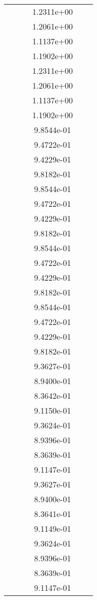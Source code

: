 \begin{xltabular}{\textwidth}{r|rS[table-format=1.3e+2]S[table-format=1.4e+2]S[table-format=1.4e+2]S[table-format=-1.5]}
&  &  & 1.2311e+00 & & \\
&  &  & 1.2061e+00 & & \\
&  &  & 1.1137e+00 & & \\
&  &  & 1.1902e+00 & & \\
&  &  & 1.2311e+00 & & \\
&  &  & 1.2061e+00 & & \\
&  &  & 1.1137e+00 & & \\
&  &  & 1.1902e+00 & & \\
&  &  & 9.8544e-01 & & \\
&  &  & 9.4722e-01 & & \\
&  &  & 9.4229e-01 & & \\
&  &  & 9.8182e-01 & & \\
&  &  & 9.8544e-01 & & \\
&  &  & 9.4722e-01 & & \\
&  &  & 9.4229e-01 & & \\
&  &  & 9.8182e-01 & & \\
&  &  & 9.8544e-01 & & \\
&  &  & 9.4722e-01 & & \\
&  &  & 9.4229e-01 & & \\
&  &  & 9.8182e-01 & & \\
&  &  & 9.8544e-01 & & \\
&  &  & 9.4722e-01 & & \\
&  &  & 9.4229e-01 & & \\
&  &  & 9.8182e-01 & & \\
&  &  & 9.3627e-01 & & \\
&  &  & 8.9400e-01 & & \\
&  &  & 8.3642e-01 & & \\
&  &  & 9.1150e-01 & & \\
&  &  & 9.3624e-01 & & \\
&  &  & 8.9396e-01 & & \\
&  &  & 8.3639e-01 & & \\
&  &  & 9.1147e-01 & & \\
&  &  & 9.3627e-01 & & \\
&  &  & 8.9400e-01 & & \\
&  &  & 8.3641e-01 & & \\
&  &  & 9.1149e-01 & & \\
&  &  & 9.3624e-01 & & \\
&  &  & 8.9396e-01 & & \\
&  &  & 8.3639e-01 & & \\
&  &  & 9.1147e-01 & & \\

\end{xltabular}
